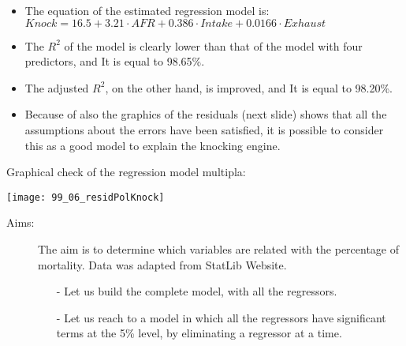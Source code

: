 \begin{frame}
  \begin{small}
    \begin{itemize}
      \item The equation of the estimated regression model is: $ Knock = 16.5 + 3.21 \cdot AFR + 0.386 \cdot Intake + 0.0166 \cdot Exhaust $
      \item The $R^2$ of the model is clearly lower than that of the model with four predictors, and It is equal to 98.65\%.
      \item The adjusted $R^2$, on the other hand, is improved, and It is equal to 98.20\%.
      \item Because of also the graphics of the residuals (next slide) shows that all the assumptions about the errors have been satisfied, it is possible to consider this as a good model to explain the knocking engine.
    \end{itemize}
  \end{small}
\end{frame}

\begin{frame}
  Graphical check of the regression model multipla:\\
  \vspace{.1cm}
  \begin{center}
    \texttt{[image: 99\_06\_residPolKnock]}
    \end{center}
\end{frame}


\begin{frame}
  \begin{description}
    \item[Aims: ]
      \begin{footnotesize}
        The aim is to determine which variables are related with the percentage of mortality. Data was adapted from StatLib Website. 
        \begin{itemize}
          \item[-] Let us build the complete model, with all the regressors.
          \item[-] Let us reach to a model in which all the regressors have significant terms at the 5\% level, by eliminating a regressor at a time.
        \end{itemize}
      \end{footnotesize}
  \end{description}
\end{frame}

